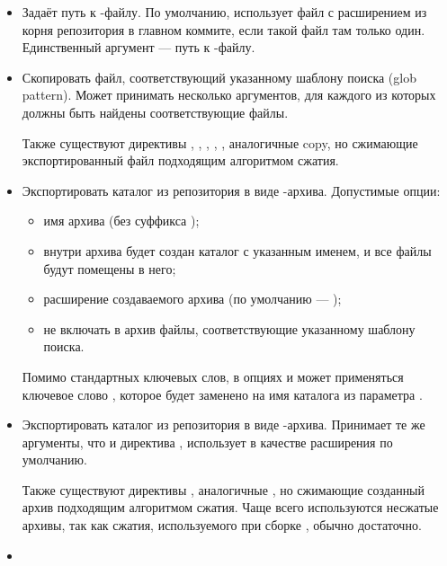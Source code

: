 \begin{itemize}
	\item {}
	
	Задаёт путь к -файлу. По умолчанию,  использует файл с 
		расширением  из корня репозитория в главном коммите, 
		если такой файл там только один. Единственный аргумент --- путь к -файлу.
	
	\item {}
	Скопировать файл, соответствующий указанному шаблону поиска (glob pattern). 
		Может принимать несколько аргументов, для каждого из которых должны 
		быть найдены соответствующие файлы.
	
	Также существуют директивы , , , , , 
		аналогичные copy, но сжимающие экспортированный файл подходящим алгоритмом сжатия.
	\item  {}

	Экспортировать каталог из репозитория в виде -архива. Допустимые опции: 
	\begin{itemize}
		\item {} имя архива (без суффикса );
		\item {} внутри архива будет создан каталог с указанным именем, 
			и все файлы будут помещены в него;
		\item {} расширение создаваемого архива (по умолчанию --- );
		\item {} не включать в архив файлы, соответствующие указанному шаблону поиска.
	\end{itemize}
	
	Помимо стандартных ключевых слов, в опциях  и  может применяться ключевое 
		слово , которое будет заменено на имя каталога из параметра . 
	\item {}
	
	Экспортировать каталог из репозитория в виде -архива. Принимает те же аргументы, 
		что и директива , использует  в качестве расширения по умолчанию. 
	
	Также существуют директивы , аналогичные 
		, но сжимающие созданный архив подходящим алгоритмом сжатия. Чаще всего используются 
		несжатые архивы, так как сжатия, используемого при сборке , обычно достаточно.
	\item  {}
	

\end{itemize}
